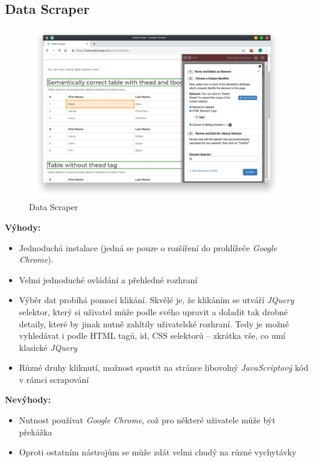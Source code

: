 \documentclass[thesis=B,czech]{FITthesis}[2012/06/26]
\begin{document}
\subsection{Data Scraper}
\begin{figure}[h]
	\includegraphics[width=\linewidth]{images/DataScraper.png}
	\caption{Data Scraper}
	\label{fig:dataScraper}
\end{figure}
\textbf{Výhody:}
\begin{itemize}
	\item Jednoduchá instalace (jedná se pouze o rozšíření do prohlížeče \emph{Google Chrome}).
	\item Velmi jednoduché ovládání a přehledné rozhraní
	\item Výběr dat probíhá pomocí klikání. Skvělé je, že klikáním se utváří \emph{JQuery} selektor, který si uživatel může podle svého upravit a doladit tak drobné detaily, které by jinak nutně zahltily uživatelské rozhraní. Tedy je možné vyhledávat i podle HTML tagů, id, CSS selektorů -- zkrátka vše, co umí klasické \emph{JQuery}
	\item Různé druhy kliknutí, možnost spustit na stránce libovolný \emph{JavaScriptový} kód v rámci scrapování
\end{itemize}

\textbf{Nevýhody:}
\begin{itemize}
	\item Nutnost používat \emph{Google Chrome}, což pro některé uživatele může být překážka
	\item Oproti ostatním nástrojům se může zdát velmi chudý na různé vychytávky
\end{itemize}

\end{document}

